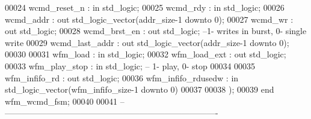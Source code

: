 \begin{DoxyCode}
00024         \textcolor{vhdlchar}{wcmd_reset_n}            \textcolor{vhdlchar}{:} \textcolor{keywordflow}{in}  \textcolor{comment}{std\_logic};
00025         \textcolor{vhdlchar}{wcmd_rdy}                    \textcolor{vhdlchar}{:} \textcolor{keywordflow}{in} \textcolor{comment}{std\_logic};
00026         \textcolor{vhdlchar}{wcmd_addr}               \textcolor{vhdlchar}{:} \textcolor{keywordflow}{out} \textcolor{comment}{std\_logic\_vector}\textcolor{vhdlchar}{(}\textcolor{vhdlchar}{addr_size}\textcolor{vhdlchar}{-}\textcolor{vhdllogic}{}\textcolor{vhdllogic}{1} \textcolor{keywordflow}{downto} \textcolor{vhdllogic}{}\textcolor{vhdllogic}{0}\textcolor{vhdlchar}{)};
00027         \textcolor{vhdlchar}{wcmd_wr}                 \textcolor{vhdlchar}{:} \textcolor{keywordflow}{out} \textcolor{comment}{std\_logic};
00028         \textcolor{vhdlchar}{wcmd_brst_en}            \textcolor{vhdlchar}{:} \textcolor{keywordflow}{out} \textcolor{comment}{std\_logic};\textcolor{keyword}{ --1- writes in burst, 0- single write}
00029         \textcolor{vhdlchar}{wcmd_last_addr}          \textcolor{vhdlchar}{:} \textcolor{keywordflow}{out} \textcolor{comment}{std\_logic\_vector}\textcolor{vhdlchar}{(}\textcolor{vhdlchar}{addr_size}\textcolor{vhdlchar}{-}\textcolor{vhdllogic}{}\textcolor{vhdllogic}{1} \textcolor{keywordflow}{downto} \textcolor{vhdllogic}{}\textcolor{vhdllogic}{0}\textcolor{vhdlchar}{)};
00030 
00031         \textcolor{vhdlchar}{wfm_load}                    \textcolor{vhdlchar}{:} \textcolor{keywordflow}{in} \textcolor{comment}{std\_logic};
00032         \textcolor{vhdlchar}{wfm_load_ext}            \textcolor{vhdlchar}{:} \textcolor{keywordflow}{out} \textcolor{comment}{std\_logic};
00033         \textcolor{vhdlchar}{wfm_play_stop}           \textcolor{vhdlchar}{:} \textcolor{keywordflow}{in} \textcolor{comment}{std\_logic};\textcolor{keyword}{ -- 1- play, 0- stop}
00034 
00035         \textcolor{vhdlchar}{wfm_infifo_rd}           \textcolor{vhdlchar}{:} \textcolor{keywordflow}{out} \textcolor{comment}{std\_logic};
00036         \textcolor{vhdlchar}{wfm_infifo_rdusedw}  \textcolor{vhdlchar}{:} \textcolor{keywordflow}{in} \textcolor{comment}{std\_logic\_vector}\textcolor{vhdlchar}{(}\textcolor{vhdlchar}{wfm_infifo_size}\textcolor{vhdlchar}{-}\textcolor{vhdllogic}{}\textcolor{vhdllogic}{1} \textcolor{keywordflow}{downto} \textcolor{vhdllogic}{}\textcolor{vhdllogic}{0}\textcolor{vhdlchar}{)}
00037         
00038         \textcolor{vhdlchar}{)};
00039 \textcolor{keywordflow}{end} \textcolor{vhdlchar}{wfm\_wcmd\_fsm};
00040 
00041 \textcolor{keyword}{-- ----------------------------------------------------------------------------}

\end{DoxyCode}

